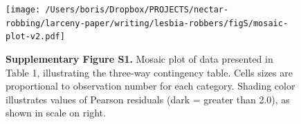 \documentclass[fleqn,10pt,lineno]{wlpeerj}
\begin{document}
\begin{figure}[ht]
\begin{center}
\texttt{[image: /Users/boris/Dropbox/PROJECTS/nectar-robbing/larceny-paper/writing/lesbia-robbers/figS/mosaic-plot-v2.pdf]}
\captionsetup{labelformat=empty,labelsep=none}
\caption{{\bf Supplementary Figure S1.} Mosaic plot of data presented in Table 1, illustrating the three-way contingency table. Cells sizes are proportional to observation number for each category. Shading color illustrates values of Pearson residuals (dark = greater than 2.0), as shown in scale on right.}
\end{center}
\end{figure}

\end{document}
